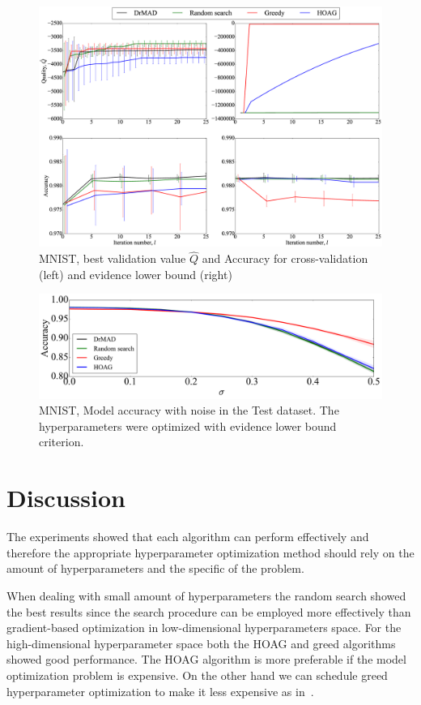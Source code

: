     \begin{figure}

    \includegraphics[width=0.5\linewidth]{plots/hyperparams/Fig_mnist.eps}

    \caption{MNIST, best validation value  $\hat{Q}$ and Accuracy  for cross-validation (left) and evidence lower bound (right)}
    \label{fig:mnist}
    \end{figure}

    \begin{figure}

    \includegraphics[width=0.5\linewidth]{plots/hyperparams/Fig_noise.pdf}

    \caption{MNIST, Model accuracy with noise in the Test dataset. The hyperparameters were optimized with evidence lower bound criterion.}
    \label{fig:noise}
    \end{figure}





\section{Discussion}
The experiments showed that each algorithm can perform effectively and therefore the appropriate hyperparameter optimization method should rely on the amount of hyperparameters and the specific of the problem. 

When dealing with small amount of hyperparameters the random search showed the best results since the search procedure can be employed more effectively than gradient-based optimization in low-dimensional hyperparameters space. For the high-dimensional hyperparameter space both the  HOAG and greed algorithms showed good performance. 
The HOAG algorithm is more preferable if the model optimization problem is expensive. On the other hand we can schedule greed hyperparameter optimization to make it less expensive as in~\cite{greed_hyper}. 

